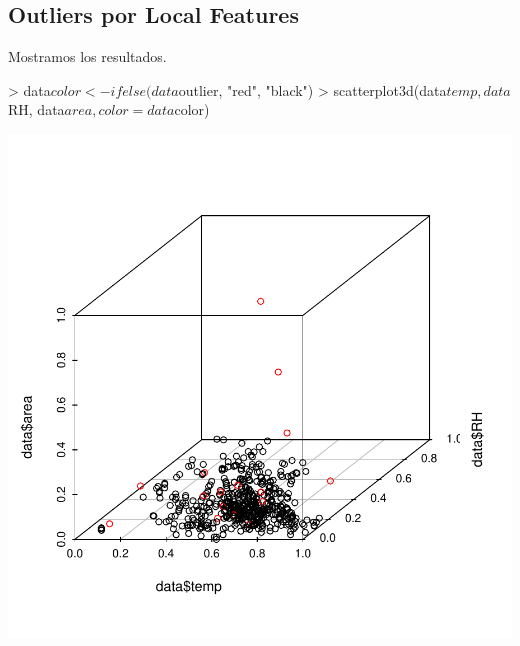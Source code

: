 \documentclass [a4paper] {article}
\begin{document}
\subsection{Outliers por Local Features}

\begin{Schunk}
\end{Schunk}

Mostramos los resultados.
\begin{center}
\begin{Schunk}
\begin{Sinput}
> data$color <- ifelse(data$outlier, "red", "black")
> scatterplot3d(data$temp, data$RH, data$area, color = data$color)
\end{Sinput}
\end{Schunk}
\includegraphics{entrega-display}
\end{center}
\end{document}
